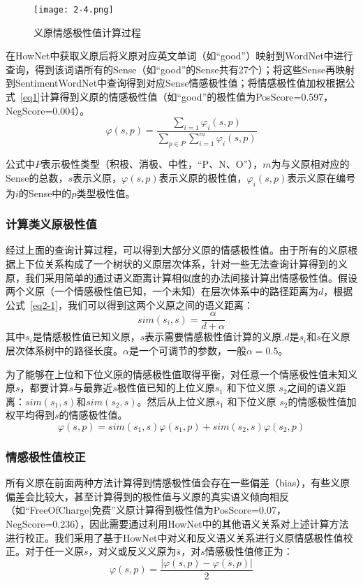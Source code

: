 \begin{figure}[htp]
\centering
\texttt{[image: 2-4.png]}
\caption{义原情感极性值计算过程}
\label{atomsen}
\end{figure}

在HowNet中获取义原后将义原对应英文单词（如“good”）映射到WordNet中进行查询，得到该词语所有的Sense（如“good”的Sense共有27个）；将这些Sense再映射到SentimentWordNet中查询得到对应Sense情感极性值；将情感极性值加权根据公式~\ref{eq1}计算得到义原的情感极性值（如“good”的极性值为PosScore=0.597，NegScore=0.004）。
\begin{equation}
\label{eq1}
\varphi(s,p)=\dfrac{\sum_{i=1} \varphi_i (s,p)}{\sum_{p\in P}\sum_{i=1}^m \varphi_i(s,p)}
\end{equation}

公式中$ P$表示极性类型（积极、消极、中性，“P、N、O”），$m$为与义原相对应的Sense的总数，$s$表示义原，$\varphi(s,p)$表示义原的极性值，$\varphi_i (s,p)$表示义原在编号为$ i $的Sense中的$ p $类型极性值。

\subsubsection{计算类义原极性值}
经过上面的查询计算过程，可以得到大部分义原的情感极性值。由于所有的义原根据上下位关系构成了一个树状的义原层次体系，针对一些无法查询计算得到的义原，我们采用简单的通过语义距离计算相似度的办法间接计算出情感极性值。假设两个义原（一个情感极性值已知，一个未知）在层次体系中的路径距离为$ d $，根据公式~\ref{eq2-1}，我们可以得到这两个义原之间的语义距离：
\begin{equation}
\label{eq2-1}
sim(s_i,s)=\dfrac{\alpha}{d+\alpha}
\end{equation}
其中$ s_i $是情感极性值已知义原，$ s $表示需要情感极性值计算的义原,$ d $是$ s_i $和$ s $在义原层次体系树中的路径长度。$ \alpha $是一个可调节的参数，一般$ \alpha=0.5 $。

为了能够在上位和下位义原的情感极性值取得平衡，对任意一个情感极性值未知义原$ s $，都要计算$ s $与最靠近$ s $极性值已知的上位义原$ s_1 $ 和下位义原 $ s_2 $之间的语义距离：$sim(s_1,s)$和$sim(s_2,s)$。然后从上位义原$ s_1 $ 和下位义原 $ s_2 $的情感极性值加权平均得到$ s $的情感极性值。
\begin{equation}
\varphi(s,p)=sim(s_1,s)\varphi(s_1,p)+sim(s_2,s)\varphi(s_2,p)
\end{equation}

\subsubsection{情感极性值校正}
所有义原在前面两种方法计算得到情感极性值会存在一些偏差（bias），有些义原偏差会比较大，甚至计算得到的极性值与义原的真实语义倾向相反（如“FreeOfCharge$ | $免费”义原计算得到极性值为PosScore=0.07，NegScore=0.236），因此需要通过利用HowNet中的其他语义关系对上述计算方法进行校正。我们采用了基于HowNet中对义和反义语义关系进行义原情感极性值校正。对于任一义原$ s $，对义或反义义原为$ \overline{s} $，对$ s $情感极性值修正为：
\begin{equation}
\varphi(s,p)=\dfrac{|\varphi(s,p)-\varphi(\overline{s} ,p)|}{2}
\end{equation}



